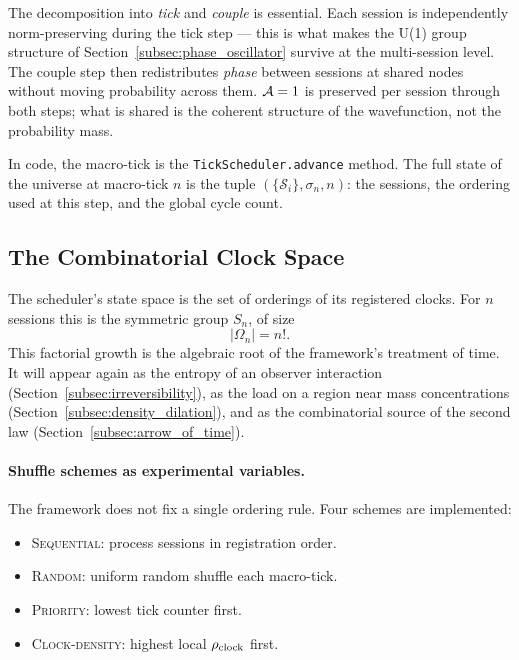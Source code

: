 The decomposition into \emph{tick} and \emph{couple} is essential.
Each session is independently norm-preserving during the tick step ---
this is what makes the U(1) group structure of
Section~\ref{subsec:phase_oscillator} survive at the multi-session level.
The couple step then redistributes \emph{phase} between sessions at
shared nodes without moving probability across them.
$\mathcal{A}=1$ is preserved per session through both steps; what is shared is
the coherent structure of the wavefunction, not the probability mass.

In code, the macro-tick is the \texttt{TickScheduler.advance} method.
The full state of the universe at macro-tick $n$ is the tuple
$(\{\mathcal{S}_i\}, \sigma_n, n)$: the sessions, the ordering used at
this step, and the global cycle count.

\subsection{The Combinatorial Clock Space}
\label{subsec:clock_space}

The scheduler's state space is the set of orderings of its registered
clocks.
For $n$ sessions this is the symmetric group $S_n$, of size
\begin{equation}
    |\Omega_n| = n!.
    \label{eq:state_space_factorial}
\end{equation}
This factorial growth is the algebraic root of the framework's
treatment of time.
It will appear again as the entropy of an observer interaction
(Section~\ref{subsec:irreversibility}), as the load on a region near
mass concentrations (Section~\ref{subsec:density_dilation}), and as the
combinatorial source of the second law
(Section~\ref{subsec:arrow_of_time}).

\paragraph{Shuffle schemes as experimental variables.}
The framework does not fix a single ordering rule.
Four schemes are implemented:

\begin{itemize}
    \item \textsc{Sequential}: process sessions in registration order.
    \item \textsc{Random}: uniform random shuffle each macro-tick.
    \item \textsc{Priority}: lowest tick counter first.
    \item \textsc{Clock-density}: highest local
    $\rho_{\mathrm{clock}}$ first.
\end{itemize}


